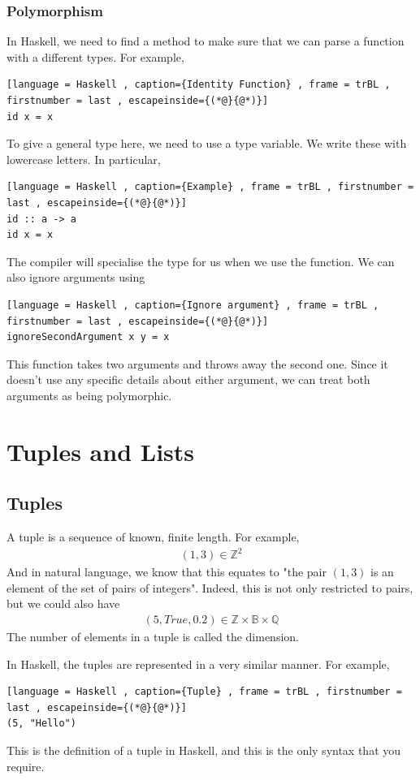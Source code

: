 \documentclass[a4paper]{article}
\theoremstyle{plain}
\theoremstyle{definition}
\newtheorem{defn}{Definition}[section]
\theoremstyle{remark}
\begin{document}
\subsubsection{Polymorphism}
In Haskell, we need to find a method to make sure that we can parse a function with a different types. For example, 
\begin{lstlisting}[language = Haskell , caption={Identity Function} , frame = trBL , firstnumber = last , escapeinside={(*@}{@*)}]
id x = x
\end{lstlisting}
To give a general type here, we need to use a type variable. We write these with lowercase letters. In particular,
\begin{lstlisting}[language = Haskell , caption={Example} , frame = trBL , firstnumber = last , escapeinside={(*@}{@*)}]
id :: a -> a
id x = x
\end{lstlisting}
The compiler will specialise the type for us when we use the function. We can also ignore arguments using
\begin{lstlisting}[language = Haskell , caption={Ignore argument} , frame = trBL , firstnumber = last , escapeinside={(*@}{@*)}]
ignoreSecondArgument x y = x
\end{lstlisting}
This function takes two arguments and throws away the second one. Since it doesn't use any specific details about either argument, we can treat both arguments as being polymorphic.
\section{Tuples and Lists}
\subsection{Tuples}
\begin{tcolorbox}[colback=black!3!white,colframe=black!60!white,title=\begin{defn}Tuple \label{Tuple}\end{defn}]
A tuple is a sequence of known, finite length. For example,
\begin{align*}
	(1,3) \in \mathbb{Z}^2
\end{align*}
And in natural language, we know that this equates to "the pair $(1,3)$ is an element of the set of pairs of integers". Indeed, this is not only restricted to pairs, but we could also have
\begin{align*}
	(5,True,0.2) \in \mathbb{Z} \times \mathbb{B} \times \mathbb{Q}
\end{align*}
The number of elements in a tuple is called the dimension.
\end{tcolorbox}
In Haskell, the tuples are represented in a very similar manner. For example,
\begin{lstlisting}[language = Haskell , caption={Tuple} , frame = trBL , firstnumber = last , escapeinside={(*@}{@*)}]
(5, "Hello")
\end{lstlisting}
This is the definition of a tuple in Haskell, and this is the only syntax that you require.
\end{document}
